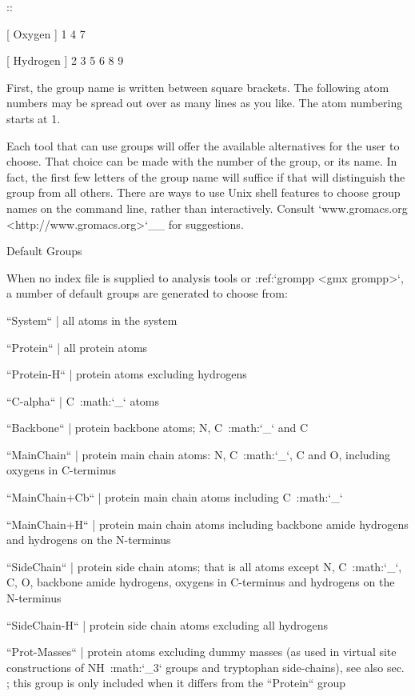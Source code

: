 ::

    [ Oxygen ]
       1       4       7

    [ Hydrogen ]
       2       3       5       6
       8       9

First, the group name is written between square brackets. The following
atom numbers may be spread out over as many lines as you like. The atom
numbering starts at 1.

Each tool that can use groups will offer the available alternatives for the
user to choose. That choice can be made with the number of the group, or
its name. In fact, the first few letters of the group name will suffice
if that will distinguish the group from all others. There are ways to
use Unix shell features to choose group names on the command line,
rather than interactively. Consult
`www.gromacs.org <http://www.gromacs.org>`__ for suggestions.

Default Groups
~~~~~~~~~~~~~~

When no index file is supplied to analysis tools or
:ref:`grompp <gmx grompp>`, a number of default
groups are generated to choose from:

``System``
    | all atoms in the system

``Protein``
    | all protein atoms

``Protein-H``
    | protein atoms excluding hydrogens

``C-alpha``
    | C\ :math:`_{\alpha}` atoms

``Backbone``
    | protein backbone atoms; N, C\ :math:`_{\alpha}` and C

``MainChain``
    | protein main chain atoms: N, C\ :math:`_{\alpha}`, C and O,
      including oxygens in C-terminus

``MainChain+Cb``
    | protein main chain atoms including C\ :math:`_{\beta}`

``MainChain+H``
    | protein main chain atoms including backbone amide hydrogens and
      hydrogens on the N-terminus

``SideChain``
    | protein side chain atoms; that is all atoms except N,
      C\ :math:`_{\alpha}`, C, O, backbone amide hydrogens, oxygens in
      C-terminus and hydrogens on the N-terminus

``SideChain-H``
    | protein side chain atoms excluding all hydrogens

``Prot-Masses``
    | protein atoms excluding dummy masses (as used in virtual site
      constructions of NH\ :math:`_3` groups and tryptophan
      side-chains), see also sec. ; this
      group is only included when it differs from the
      ``Protein`` group

